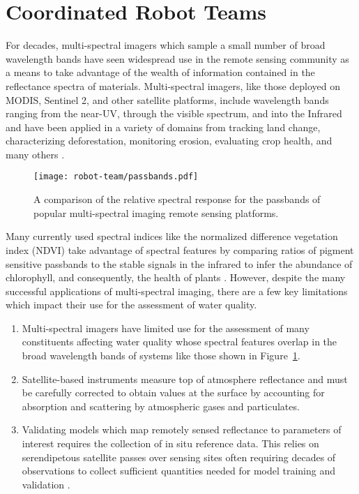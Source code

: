 \section{Coordinated Robot Teams}

For decades, multi-spectral imagers which sample a small number of
broad wavelength bands have seen widespread use in
the remote sensing community as a means to take advantage of the wealth of
information contained in the reflectance spectra of materials. Multi-spectral imagers,
like those deployed on MODIS, Sentinel 2, and other satellite platforms, include
wavelength bands ranging from the near-UV,
through the visible spectrum, and into the Infrared and have been applied in a
variety of domains from tracking land change, characterizing deforestation,
monitoring erosion, evaluating crop health, and many others
\cite{remote-sensing-foliage, remote-sensing-applications, thenkabail-indices}.

\begin{figure}[!hbt]
  \centering
  \texttt{[image: robot-team/passbands.pdf]}
  \caption{A comparison of the relative spectral response for the passbands of popular multi-spectral imaging remote sensing platforms.}
  \label{fig:passbands}
\end{figure}

Many currently used spectral indices like the normalized difference vegetation
index (NDVI) take advantage of spectral features by comparing ratios of
pigment sensitive passbands to the stable signals in the infrared to infer the
abundance of chlorophyll, and consequently, the health of plants
\cite{ndvi-chlorophyll}.  However, despite the many successful
applications of multi-spectral imaging, there are a few key limitations which
impact their use for the assessment of water quality.

\begin{enumerate}
  \item Multi-spectral imagers have limited use for the assessment of many
    constituents affecting water quality whose spectral features overlap in the
    broad wavelength bands of systems like those shown in Figure~\ref{fig:passbands}.
  \item Satellite-based instruments measure top of atmosphere reflectance and
    must be carefully corrected to obtain values at the surface by accounting for
    absorption and scattering by atmospheric gases and particulates.
  \item Validating models which map remotely sensed reflectance to parameters of
    interest requires the collection of in situ reference data. This relies on
    serendipetous satellite passes over sensing sites often requiring decades of
    observations to collect sufficient quantities needed for model training and
    validation \cite{aurin2018remote, ross2019aquasat}.
\end{enumerate}

